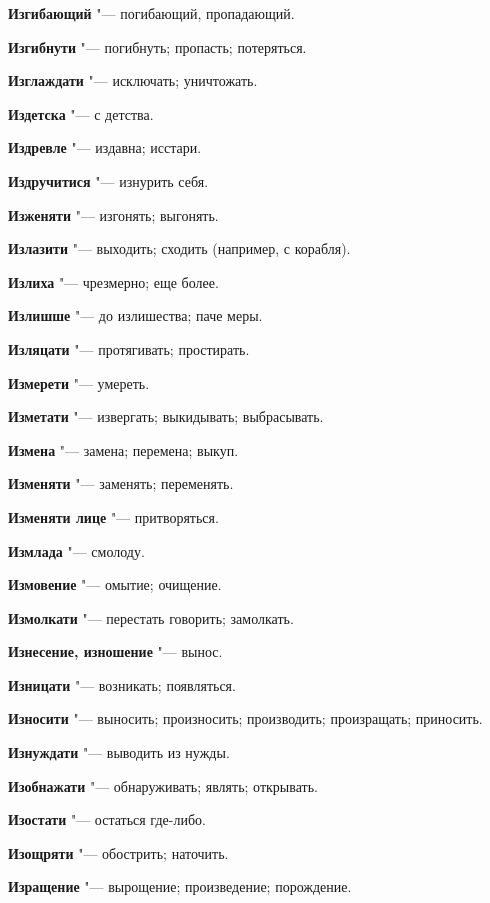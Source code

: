 \begin{mymulticols}
\noindent\textbf{Изгибающий} "--- погибающий, пропадающий. 

\noindent\textbf{Изгибнути} "--- погибнуть; пропасть; потеряться. 

\noindent\textbf{Изглаждати} "--- исключать; уничтожать. 

\noindent\textbf{Издетска} "--- с детства. 

\noindent\textbf{Издревле} "--- издавна; исстари. 

\noindent\textbf{Издручитися} "--- изнурить себя. 

\noindent\textbf{Изженяти} "--- изгонять; выгонять. 

\noindent\textbf{Излазити} "--- выходить; сходить (например, с корабля). 

\noindent\textbf{Излиха} "--- чрезмерно; еще более. 

\noindent\textbf{Излишше} "--- до излишества; паче меры. 

\noindent\textbf{Изляцати} "--- протягивать; простирать. 

\noindent\textbf{Измерети} "--- умереть. 

\noindent\textbf{Изметати} "--- извергать; выкидывать; выбрасывать. 

\noindent\textbf{Измена} "--- замена; перемена; выкуп. 

\noindent\textbf{Изменяти} "--- заменять; переменять. 

\noindent\textbf{Изменяти лице} "--- притворяться. 

\noindent\textbf{Измлада} "--- смолоду. 

\noindent\textbf{Измовение} "--- омытие; очищение. 

\noindent\textbf{Измолкати} "--- перестать говорить; замолкать. 

\noindent\textbf{Изнесение, изношение} "--- вынос. 

\noindent\textbf{Изницати} "--- возникать; появляться. 

\noindent\textbf{Износити} "--- выносить; произносить; производить; произращать; приносить. 

\noindent\textbf{Изнуждати} "--- выводить из нужды. 

\noindent\textbf{Изобнажати} "--- обнаруживать; являть; открывать. 

\noindent\textbf{Изостати} "--- остаться где-либо. 

\noindent\textbf{Изощряти} "--- обострить; наточить. 

\noindent\textbf{Изращение} "--- вырощение; произведение; порождение. 


\end{mymulticols}
